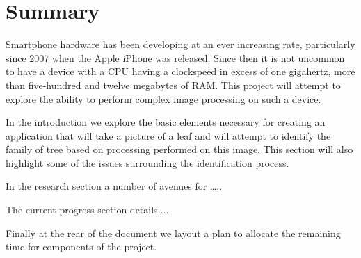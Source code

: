 \chapter*{Summary}

Smartphone hardware has been developing at an ever increasing rate, particularly since 2007 when the Apple iPhone\textsuperscript{\texttrademark} was released. Since then it is not uncommon to have a device with a CPU having a clockspeed in excess of one gigahertz, more than five-hundred and twelve megabytes of RAM. This project will attempt to explore the ability to perform complex image processing on such a device. 

In the introduction we explore the basic elements necessary for creating an application that will take a picture of a leaf and will attempt to identify the family of tree based on processing performed on this image. This section will also highlight some of the issues surrounding the identification process.

In the research section a number of avenues for …..

The current progress section details....

Finally at the rear of the document we layout a plan to allocate the remaining time for components of the project.

